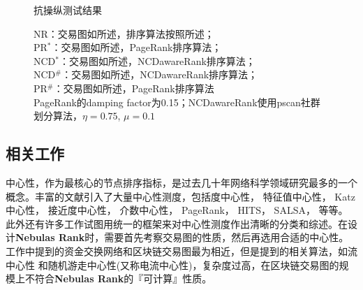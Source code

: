 \begin{figure}[h]
	\centering
	\caption{抗操纵测试结果}\label{fig:antiManipulation}
	\caption*{\footnotesize{NR：交易图如所述，排序算法按照所述；\\PR$^*$：交易图如所述，PageRank排序算法；\\ NCD$^*$：交易图如所述，NCDawareRank排序算法；\\ NCD$^{\#}$：交易图如\cite{nem}所述，NCDawareRank排序算法；\\ PR$^{\#}$：交易图如\cite{nem}所述，PageRank排序算法 \\ PageRank的damping factor为0.15；NCDawareRank使用pscan\cite{chang2017mathsf}社群划分算法，$\eta=0.75$, $\mu=0.1$}}
\end{figure}

\subsection{相关工作} \label{subsec:related}
中心性，作为最核心的节点排序指标，是过去几十年网络科学领域研究最多的一个概念\cite{newman2010networks}。丰富的文献引入了大量中心性测度，包括度中心性\cite{freeman1979set}， 特征值中心性\cite{bonacich1972factoring}， Katz中心性\cite{katz1953new}， 接近度中心性\cite{sabidussi1966centrality}， 介数中心性\cite{freeman1977set}\cite{freeman1978centrality}\cite{freeman1991centrality}\cite{noh2004random}\cite{newman2005measure}， PageRank\cite{Brin2010}， HITS\cite{kleinberg1999authoritative}， SALSA\cite{Science2001}， 等等。此外还有许多工作试图用统一的框架来对中心性测度作出清晰的分类和综述\cite{Borgatti2005}\cite{Borgatti2006}\cite{Lu2016}。在设计\textbf{Nebulas Rank}时，需要首先考察交易图的性质，然后再选用合适的中心性。\textcite{Borgatti2005}工作中提到的资金交换网络和区块链交易图最为相近，但是提到的相关算法，如流中心性\cite{freeman1991centrality} 和随机游走中心性(又称电流中心性)\cite{newman2005measure}，复杂度过高，在区块链交易图的规模上不符合\textbf{Nebulas Rank}的『可计算』性质。

